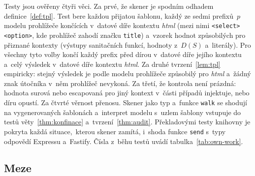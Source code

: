 Testy jsou ověřeny čtyři věci. Za prvé, že skener je spodním odhadem definice~\ref{def:tpl}. Test bere každou přijatou šablonu, každý ze sedmi prefixů~$p$ modelu prohlížeče končících v~datové díře kontextu \emph{html} (mezi nimi \texttt{<select><option>}, kde prohlížeč zahodí značku \texttt{title}) a~vzorek hodnot způsobilých pro přiznané kontexty (výstupy sanitačních funkcí, hodnoty z~$D(S)$ a~literály). Pro všechny tyto volby končí každý prefix před dírou v~datové díře jejího kontextu a~celý výsledek v~datové díře kontextu \emph{html}. Za druhé tvrzení~\ref{lem:tpl} empiricky: stejný výsledek je podle modelu prohlížeče způsobilý pro \emph{html} a~žádný znak útočníka v~něm prohlížeč nevykoná. Za třetí, že kontrola není prázdná: hodnota surová nebo escapovaná pro jiný kontext v~části případů injektuje, nebo díru opustí. Za čtvrté věrnost přenosu. Skener jako typ a~funkce \texttt{walk} se shodují na vygenerovaných šablonách a~interpret modelu s~uzlem šablony vstupuje do testů věty~\ref{thm:konfinace} a~tvrzení~\ref{thm:audit}. Překladovými testy knihovny je pokryta každá situace,~kterou skener zamítá, i~shoda funkce \texttt{send} s~typy odpovědí Expressu a~Fastify. Čísla z~běhu testů uvádí tabulka~\ref{tab:own-work}.

\subsection{Meze}
\label{sec:lib-meze}

